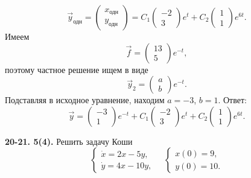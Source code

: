 \begin{equation*}
    \vec{y}_{\text{одн}} = \begin{pmatrix}
        x_{\text{одн}} \\ y_{\text{одн}}
    \end{pmatrix} = C_1\begin{pmatrix}
        -2 \\ 3
    \end{pmatrix}e^t + C_2\begin{pmatrix}
        1 \\ 1
    \end{pmatrix}e^{6t}.
\end{equation*}
Имеем
\begin{equation*}
    \vec{f} = \begin{pmatrix}
        13 \\ 5
    \end{pmatrix}e^{-t},
\end{equation*}
поэтому частное решение ищем в виде
\begin{equation*}
    \vec{y}_2 = \begin{pmatrix}
        a \\ b
    \end{pmatrix}e^{-t}.
\end{equation*}
Подставляя в исходное уравнение, находим $a = -3$, $b = 1$. Ответ:
\begin{equation*}
    \vec{y} = \begin{pmatrix}
        -3 \\ 1
    \end{pmatrix}e^{-t} + C_1\begin{pmatrix}
        -2 \\ 3
    \end{pmatrix}e^t + C_2\begin{pmatrix}
        1 \\ 1
    \end{pmatrix}e^{6t}.
\end{equation*}

\begin{task}
    \textbf{20-21. 5(4).} Решить задачу Коши
    \begin{equation*}
        \begin{cases}
            \dot{x} = 2x - 5y, \\ \dot{y} = 4x - 10y,
        \end{cases} \hspace{1em} \begin{cases}
             x(0) = 9, \\ y(0) = 10.
        \end{cases}
    \end{equation*}
\end{task}

